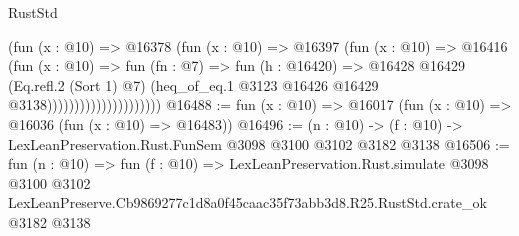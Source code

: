 \begin{lexlean}{RustStd}
\begin{coremodule}
                                    (fun (x : @10) =>
                                    @16378
                                      (fun (x : @10) =>
                                      @16397
                                        (fun (x : @10) =>
                                        @16416
                                          (fun (x : @10) =>
                                          fun (fn : @7) =>
                                          fun (h : @16420) =>
                                          @16428
                                            @16429
                                            (Eq.refl.{2} (Sort 1) @7)
                                            (heq_of_eq.{1}
                                              @3123
                                              @16426
                                              @16429
                                              @3138)))))))))))))))))))))
@16488 := fun (x : @10) => @16017 (fun (x : @10) => @16036 (fun (x : @10) => @16483))
@16496 := (n : @10) -> (f : @10) -> LexLeanPreservation.Rust.FunSem @3098 @3100 @3102 @3182 @3138
@16506 := fun (n : @10) =>
  fun (f : @10) =>
  LexLeanPreservation.Rust.simulate
    @3098
    @3100
    @3102
    LexLeanPreserve.Cb9869277c1d8a0f45caac35f73abb3d8.R25.RustStd.crate_ok
    @3182
    @3138
\end{coremodule}
\end{lexlean}
